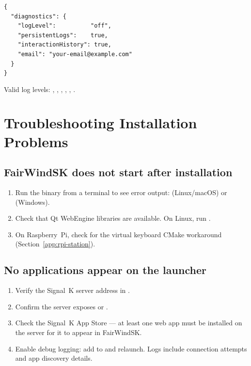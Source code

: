 \begin{lstlisting}
{
  "diagnostics": {
    "logLevel":          "off",
    "persistentLogs":    true,
    "interactionHistory": true,
    "email": "your-email@example.com"
  }
}
\end{lstlisting}

Valid log levels: , , ,
, , .

\section{Troubleshooting Installation Problems}
\label{app:troubleshooting-install}

\subsection{FairWindSK does not start after installation}

\begin{enumerate}
  \item Run the binary from a terminal to see error output:
         (Linux/macOS) or
         (Windows).
  \item Check that Qt WebEngine libraries are available.
        On Linux, run .
  \item On Raspberry~Pi, check for the virtual keyboard CMake workaround
        (Section~\ref{app:rpi-station}).
\end{enumerate}

\subsection{No applications appear on the launcher}

\begin{enumerate}
  \item Verify the Signal~K server address in
        .
  \item Confirm the server exposes
         or .
  \item Check the Signal~K App Store --- at least one web app must be
        installed on the server for it to appear in FairWindSK.
  \item Enable debug logging: add  to
         and relaunch.
        Logs include connection attempts and app discovery details.
\end{enumerate}

